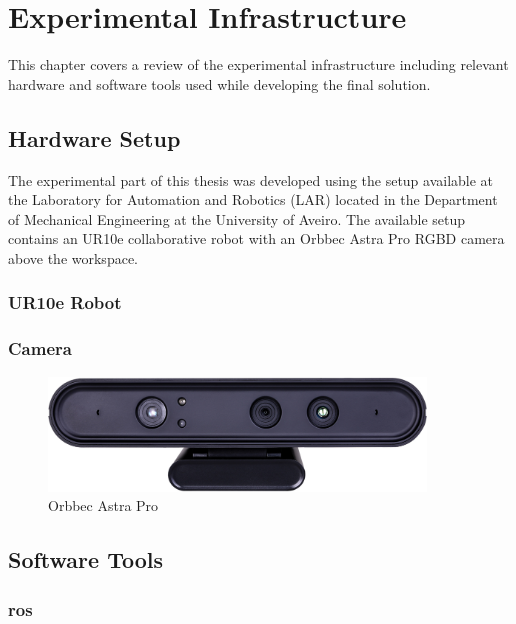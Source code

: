 \chapter{Experimental Infrastructure}
\label{chapter:experimental_infrastructure}

This chapter covers a review of the experimental infrastructure including relevant hardware and software tools used while developing the final solution.


\section{Hardware Setup}

The experimental part of this thesis was developed using the setup available at the Laboratory for Automation and Robotics (LAR) located in the Department of Mechanical Engineering at the University of Aveiro. The available setup contains an UR10e collaborative robot with an Orbbec Astra Pro RGBD camera above the workspace.

\subsection{UR10e Robot}

\subsection{Camera}

\begin{figure}[h]
\centerline{\includegraphics[height=1.2in]{figs/Astra.jpg}}
\caption[Orbbec Astra Pro]{Orbbec Astra Pro \cite{AstraPro}}
\label{openpose}
\end{figure}

\section{Software Tools}

\subsection{\acf{ros}}

